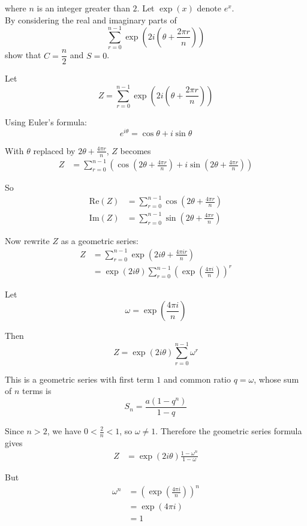 \documentclass[leqno]{article}
\begin{document}
\begin{enumerate}[
  label=\textbf{\arabic*.},
  leftmargin=*,
  topsep=0pt,
  partopsep=0pt,
  parsep=0pt
]
where $n$ is an integer greater than $2$. Let $\exp(x)$ denote $e^x$.\\


By considering the real and imaginary parts of
\[
\sum_{r=0}^{n-1} \exp\left(2i\left(\theta + \dfrac{2\pi r}{n}\right)\right)
\]
show that $C= \dfrac{n}{2}$ and $S = 0$.  \\

\vspace*{10pt}

\begin{djsSolution}
Let
\[
Z=\sum_{r=0}^{n-1}\exp\left(2i\left(\theta+\frac{2\pi r}{n}\right)\right)
\]

Using Euler's formula:
\[
e^{i\theta}=\cos\theta+i\sin\theta
\]

With \(\theta\) replaced by \(2\theta+\frac{4\pi r}{n}\), \(Z\) becomes
\begin{align*}
Z
&=\sum_{r=0}^{n-1}\left(\cos\left(2\theta+\frac{4\pi r}{n}\right)+i\sin\left(2\theta+\frac{4\pi r}{n}\right)\right)
\end{align*}

So
\begin{align*}
\mathrm{Re}(Z)&=\sum_{r=0}^{n-1}\cos\left(2\theta+\frac{4\pi r}{n}\right) \\
\mathrm{Im}(Z)&=\sum_{r=0}^{n-1}\sin\left(2\theta+\frac{4\pi r}{n}\right)
\end{align*}

Now rewrite \(Z\) as a geometric series:
\begin{align*}
Z
&=\sum_{r=0}^{n-1}\exp\left(2i\theta+\frac{4\pi ir}{n}\right) \\
&=\exp(2i\theta)\sum_{r=0}^{n-1}\left(\exp\left(\frac{4\pi i}{n}\right)\right)^r
\end{align*}

Let
\[
\omega=\exp\left(\frac{4\pi i}{n}\right)
\]

Then
\[
Z=\exp(2i\theta)\sum_{r=0}^{n-1}\omega^r
\]

This is a geometric series with first term \(1\) and common ratio \(q=\omega\), whose sum of \(n\) terms is
\[
S_n=\dfrac{a(1-q^n)}{1-q}
\]

Since \(n>2\), we have \(0<\frac{2}{n}<1\), so \(\omega\neq 1\). Therefore the geometric series formula gives
\begin{align*}
Z
&=\exp(2i\theta)\frac{1-\omega^n}{1-\omega}
\end{align*}

But
\begin{align*}
\omega^n
&=\left(\exp\left(\frac{4\pi i}{n}\right)\right)^n \\
&=\exp(4\pi i) \\
&=1
\end{align*}


\end{djsSolution}
\end{enumerate}
\end{document}
